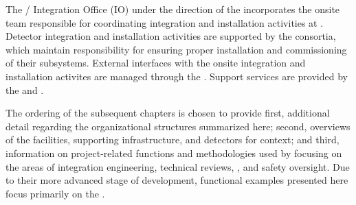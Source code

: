 The / Integration Office (IO) under the 
direction of the  incorporates the onsite team responsible 
for coordinating integration and installation activities at .
Detector integration and installation activities are supported by the
 consortia, which maintain responsibility for ensuring
proper installation and commissioning of their subsystems.  External
 interfaces with the onsite integration and installation
activites are managed through the . Support services are
provided by the  and .

The ordering of the subsequent chapters is chosen to provide first,  
additional detail regarding the organizational structures summarized 
here; second, overviews of the facilities, supporting infrastructure, 
and detectors for context; and third, information on project-related 
functions and methodologies used by   
focusing on the areas of integration engineering, technical reviews, 
, and safety oversight.  Due to their more advanced stage 
of development, functional examples presented here focus primarily on 
the  .
